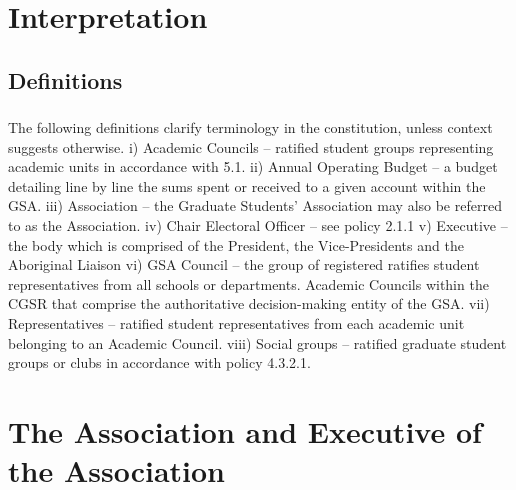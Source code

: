 \documentclass{article}
\begin{document}
\tableofcontents
\section{Interpretation}
\subsection{Definitions} 
\subsubsection{} The following definitions clarify terminology in the constitution, unless context suggests otherwise. 
i) Academic Councils – ratified student groups representing academic units in accordance with 5.1. 
ii) Annual Operating Budget – a budget detailing line by line the sums spent or received to a given account within the GSA. 
iii) Association – the Graduate Students’ Association may also be referred to as the Association. 
iv) Chair Electoral Officer – see policy 2.1.1 
v) Executive – the body which is comprised of the President, the Vice-Presidents and the Aboriginal Liaison 
vi) GSA Council – the group of registered ratifies student representatives from all schools or departments. Academic Councils within the CGSR that comprise the authoritative decision-making entity of the GSA. 
vii) Representatives – ratified student representatives from each academic unit belonging to an Academic Council. 
viii) Social groups – ratified graduate student groups or clubs in accordance with policy 4.3.2.1. 
\section{The Association and Executive of the Association }
\end{document}
